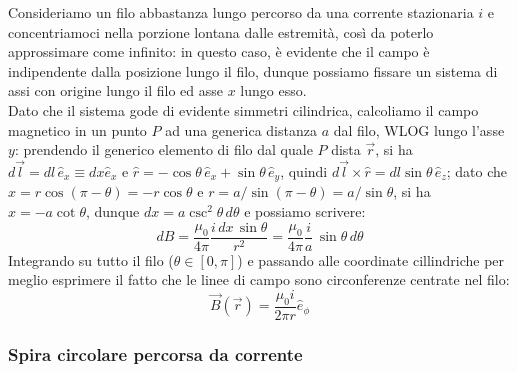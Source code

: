 Consideriamo un filo abbastanza lungo percorso da una corrente stazionaria $ i $ e concentriamoci nella porzione lontana dalle estremità, così da poterlo approssimare come infinito: in questo caso, è evidente che il campo è indipendente dalla posizione lungo il filo, dunque possiamo fissare un sistema di assi con origine lungo il filo ed asse $ x $ lungo esso. \\ 
%
Dato che il sistema gode di evidente simmetri cilindrica, calcoliamo il campo magnetico in un punto $ P $ ad una generica distanza $ a $ dal filo, WLOG lungo l'asse $ y $: prendendo il generico elemento di filo dal quale $ P $ dista $ \vec{r} $, si ha $ d\vec{l} = dl \, \hat{e}_x \equiv dx \hat{e}_x $ e $ \hat{r} = -\cos{\theta} \, \hat{e}_x + \sin{\theta} \, \hat{e}_y $, quindi $ d\vec{l} \times \hat{r} = dl \sin{\theta} \, \hat{e}_z $; dato che $ x = r \cos{(\pi - \theta)} = - r \cos{\theta} $ e $ r = a / \sin{(\pi - \theta)} = a / \sin{\theta} $, si ha $ x = - a \cot{\theta} $, dunque $ dx = a \csc^2{\theta} \, d\theta $ e possiamo scrivere:
\begin{equation}
	dB = \displaystyle\frac{\mu_0}{4\pi} \displaystyle\frac{i\, dx \, \sin{\theta}}{r^2} = \displaystyle\frac{\mu_0}{4\pi} \displaystyle\frac{i}{a} \, \sin{\theta} \, d\theta
	\label{eq:filo-calc}
\end{equation}
Integrando su tutto il filo ($ \theta \in [0, \pi] $) e passando alle coordinate cillindriche per meglio esprimere il fatto che le linee di campo sono circonferenze centrate nel filo:
\begin{equation}
	\vec{B}(\vec{r}) = \displaystyle\frac{\mu_0 i}{2\pi r} \hat{e}_{\phi}
	\label{eq:mag-filo-corr}
\end{equation}

\subsubsection{Spira circolare percorsa da corrente}

